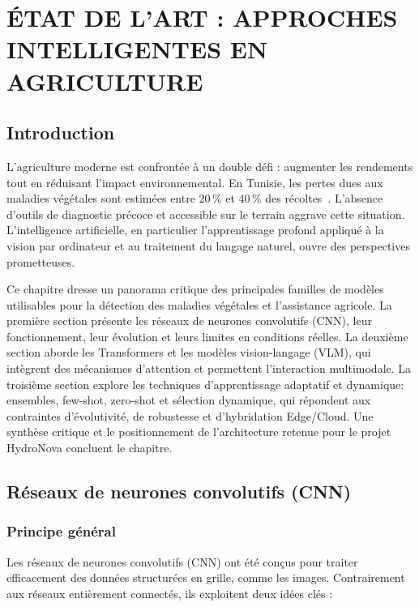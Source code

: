 \chapter{ÉTAT DE L'ART : APPROCHES INTELLIGENTES EN AGRICULTURE}

\section*{Introduction}

L'agriculture moderne est confrontée à un double défi : augmenter les rendements tout en réduisant l'impact environnemental. En Tunisie, les pertes dues aux maladies végétales sont estimées entre 20\,\% et 40\,\% des récoltes~\cite{fao2021report}. L'absence d'outils de diagnostic précoce et accessible sur le terrain aggrave cette situation. L'intelligence artificielle, en particulier l'apprentissage profond appliqué à la vision par ordinateur et au traitement du langage naturel, ouvre des perspectives prometteuses.


Ce chapitre dresse un panorama critique des principales familles de modèles utilisables pour la détection des maladies végétales et l'assistance agricole. La première section présente les réseaux de neurones convolutifs (CNN), leur fonctionnement, leur évolution et leurs limites en conditions réelles. La deuxième section aborde les Transformers et les modèles vision-langage (VLM), qui intègrent des mécanismes d'attention et permettent l'interaction multimodale. La troisième section explore les techniques d'apprentissage adaptatif et dynamique: ensembles, few-shot, zero-shot et sélection dynamique, qui répondent aux contraintes d'évolutivité, de robustesse et d'hybridation Edge/Cloud. Une synthèse critique et le positionnement de l'architecture retenue pour le projet HydroNova concluent le chapitre.
\newpage
\section{Réseaux de neurones convolutifs (CNN)}
\label{sec:cnnn}

\subsection{Principe général}
Les réseaux de neurones convolutifs (CNN) ont été conçus pour traiter efficacement des données structurées en grille, comme les images. Contrairement aux réseaux entièrement connectés, ils exploitent deux idées clés :

